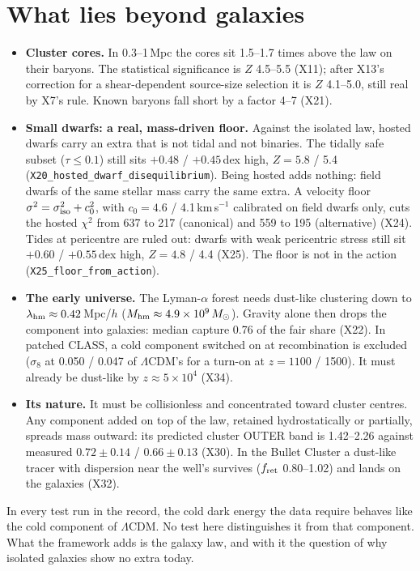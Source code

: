 \documentclass[10pt]{article}
\begin{document}
\section{What lies beyond galaxies}
\begin{itemize}
\item \textbf{Cluster cores.} In 0.3--1\,Mpc the cores sit 1.5--1.7 times above the law on their baryons. The statistical significance is $Z$ 4.5--5.5 (X11); after X13's correction for a shear-dependent source-size selection it is $Z$ 4.1--5.0, still real by X7's rule. Known baryons fall short by a factor 4--7 (X21).
\item \textbf{Small dwarfs: a real, mass-driven floor.} Against the isolated law, hosted dwarfs carry an extra that is not tidal and not binaries. The tidally safe subset ($\tau\le0.1$) still sits $+0.48$ / $+0.45$\,dex high, $Z=5.8$ / 5.4 (\texttt{X20\_hosted\_dwarf\_disequilibrium}). Being hosted adds nothing: field dwarfs of the same stellar mass carry the same extra. A velocity floor $\sigma^2=\sigma_{\rm iso}^2+c_0^2$, with $c_0=4.6$ / 4.1\,km\,s$^{-1}$ calibrated on field dwarfs only, cuts the hosted $\chi^2$ from 637 to 217 (canonical) and 559 to 195 (alternative) (X24). Tides at pericentre are ruled out: dwarfs with weak pericentric stress still sit $+0.60$ / $+0.55$\,dex high, $Z=4.8$ / 4.4 (X25). The floor is not in the action (\texttt{X25\_floor\_from\_action}).
\item \textbf{The early universe.} The Lyman-$\alpha$ forest needs dust-like clustering down to $\lambda_{\rm hm}\approx0.42$\,Mpc/$h$ ($M_{\rm hm}\approx4.9\times10^{9}\,M_\odot$). Gravity alone then drops the component into galaxies: median capture 0.76 of the fair share (X22). In patched CLASS, a cold component switched on at recombination is excluded ($\sigma_8$ at 0.050 / 0.047 of $\Lambda$CDM's for a turn-on at $z=1100$ / 1500). It must already be dust-like by $z\approx5\times10^4$ (X34).
\item \textbf{Its nature.} It must be collisionless and concentrated toward cluster centres. Any component added on top of the law, retained hydrostatically or partially, spreads mass outward: its predicted cluster OUTER band is 1.42--2.26 against measured $0.72\pm0.14$ / $0.66\pm0.13$ (X30). In the Bullet Cluster a dust-like tracer with dispersion near the well's survives ($f_{\rm ret}$ 0.80--1.02) and lands on the galaxies (X32).
\end{itemize}
In every test run in the record, the cold dark energy the data require behaves like the cold component of $\Lambda$CDM. No test here distinguishes it from that component. What the framework adds is the galaxy law, and with it the question of why isolated galaxies show no extra today.
\end{document}
